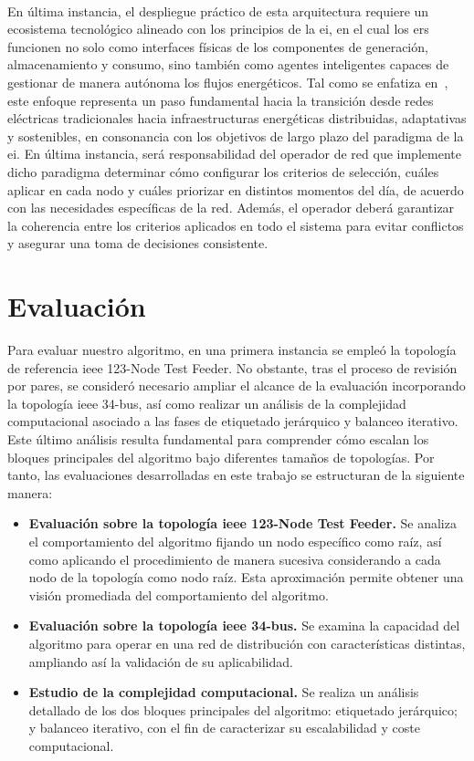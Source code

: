 \\
En última instancia, el despliegue práctico de esta arquitectura requiere un ecosistema tecnológico alineado con los principios de la \gls{ei}, en el cual los \glspl{er} funcionen no solo como interfaces físicas de los componentes de generación, almacenamiento y consumo, sino también como agentes inteligentes capaces de gestionar de manera autónoma los flujos energéticos. Tal como se enfatiza en~\cite{Fawaz2025}, este enfoque representa un paso fundamental hacia la transición desde redes eléctricas tradicionales hacia infraestructuras energéticas distribuidas, adaptativas y sostenibles, en consonancia con los objetivos de largo plazo del paradigma de la \gls{ei}. En última instancia, será responsabilidad del operador de red que implemente dicho paradigma determinar cómo configurar los criterios de selección, cuáles aplicar en cada nodo y cuáles priorizar en distintos momentos del día, de acuerdo con las necesidades específicas de la red. Además, el operador deberá garantizar la coherencia entre los criterios aplicados en todo el sistema para evitar conflictos y asegurar una toma de decisiones consistente.


\section{Evaluación}
\label{sec:evaluation_bloste}

Para evaluar nuestro algoritmo, en una primera instancia se empleó la topología de referencia \gls{ieee} 123-Node Test Feeder. No obstante, tras el proceso de revisión por pares, se consideró necesario ampliar el alcance de la evaluación incorporando la topología \gls{ieee} 34-bus, así como realizar un análisis de la complejidad computacional asociado a las fases de etiquetado jerárquico y balanceo iterativo. Este último análisis resulta fundamental para comprender cómo escalan los bloques principales del algoritmo bajo diferentes tamaños de topologías. Por tanto, las evaluaciones desarrolladas en este trabajo se estructuran de la siguiente manera:

\begin{itemize}
    \item \textbf{Evaluación sobre la topología \gls{ieee} 123-Node Test Feeder.} Se analiza el comportamiento del algoritmo fijando un nodo específico como raíz, así como aplicando el procedimiento de manera sucesiva considerando a cada nodo de la topología como nodo raíz. Esta aproximación permite obtener una visión promediada del comportamiento del algoritmo.

    \item \textbf{Evaluación sobre la topología \gls{ieee} 34-bus.} Se examina la capacidad del algoritmo para operar en una red de distribución con características distintas, ampliando así la validación de su aplicabilidad.

    \item \textbf{Estudio de la complejidad computacional.} Se realiza un análisis detallado de los dos bloques principales del algoritmo: etiquetado jerárquico; y balanceo iterativo, con el fin de caracterizar su escalabilidad y coste computacional.
\end{itemize}



